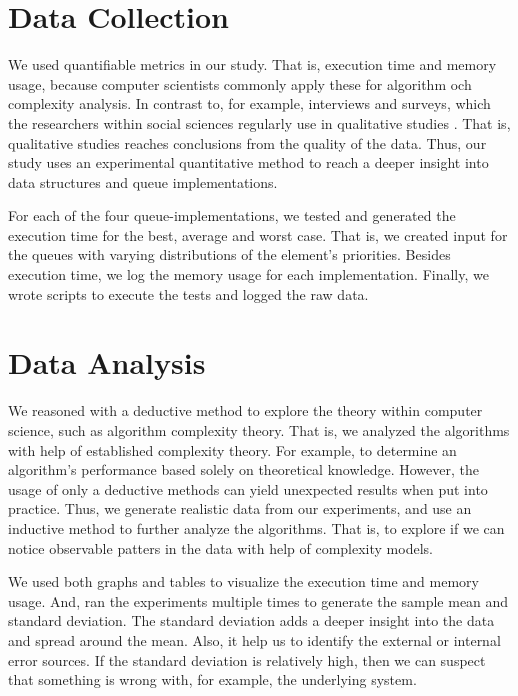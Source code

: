 \documentclass[a4paper,11pt]{kth-mag}
\newcommand*{\skippara}{\par\vspace{\baselineskip} \noindent}
\begin{document}
\section{Data Collection}
We used quantifiable metrics in our study.
That is, execution time and memory usage, because computer scientists commonly apply these for algorithm och complexity analysis.
In contrast to, for example, interviews and surveys, which the researchers within social sciences regularly use in qualitative studies \cite{Omexperi69:online, haakansson2013portal}.
That is, qualitative studies reaches conclusions from the quality of the data.
Thus, our study uses an experimental quantitative method to reach a deeper insight into data structures and queue implementations.

\skippara For each of the four queue-implementations, we tested and generated the execution time for the best, average and worst case.
That is, we created input for the queues with varying distributions of the element's priorities.
Besides execution time, we log the memory usage for each implementation.
Finally, we wrote scripts to execute the tests and logged the raw data.

\section{Data Analysis}
We reasoned with a deductive method to explore the theory within computer science, such as algorithm complexity theory.
That is, we analyzed the algorithms with help of established complexity theory.
For example, to determine an algorithm's performance based solely on theoretical knowledge.
However, the usage of only a deductive methods can yield unexpected results when put into practice.
Thus, we generate realistic data from our experiments, and use an inductive method to further analyze the algorithms.
That is, to explore if we can notice observable patters in the data with help of complexity models.

\skippara We used both graphs and tables to visualize the execution time and memory usage.
And, ran the experiments multiple times to generate the sample mean and standard deviation.
The standard deviation adds a deeper insight into the data and spread around the mean.
Also, it help us to identify the external or internal error sources.
If the standard deviation is relatively high, then we can suspect that something is wrong with, for example, the underlying system.
\end{document}
